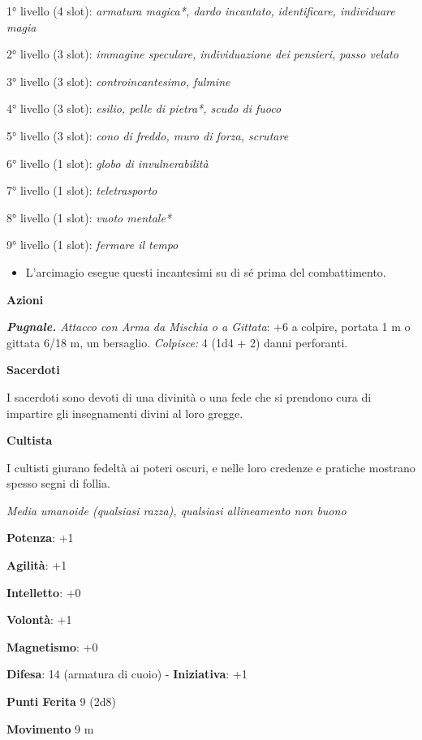 \begin{multicols}{2}
1° livello (4 slot): \emph{armatura magica*, dardo incantato,}
\emph{identificare, individuare magia}

2° livello (3 slot): \emph{immagine speculare, individuazione dei}
\emph{pensieri, passo velato}

3° livello (3 slot): \emph{controincantesimo, fulmine}

4° livello (3 slot): \emph{esilio, pelle di pietra*, scudo di fuoco}

5° livello (3 slot): \emph{cono di freddo, muro di forza, scrutare}

6° livello (1 slot): \emph{globo di invulnerabilità}

7° livello (1 slot): \emph{teletrasporto}

8° livello (1 slot): \emph{vuoto mentale*}

9° livello (1 slot): \emph{fermare il tempo}


\begin{itemize}
\item
  L'arcimagio esegue questi incantesimi su di sé prima del
  combattimento.
\end{itemize}


\smallskip\textbf{Azioni}

\emph{\textbf{Pugnale.} Attacco con Arma da Mischia o a Gittata}: +6 a
colpire, portata 1 m o gittata 6/18 m, un bersaglio. \emph{Colpisce:}
4 (1d4 + 2) danni perforanti.


\textbf{Sacerdoti}

I sacerdoti sono devoti di una divinità o una fede che si prendono cura
di impartire gli insegnamenti divini al loro gregge.

\textbf{Cultista}

I cultisti giurano fedeltà ai poteri oscuri, e nelle loro credenze e
pratiche mostrano spesso segni di follia.

\emph{Media umanoide (qualsiasi razza), qualsiasi allineamento non
buono}

\textbf{Potenza}: +1

\textbf{Agilità}: +1

\textbf{Intelletto}: +0

\textbf{Volontà}: +1

\textbf{Magnetismo}: +0

\textbf{Difesa}: 14 (armatura di cuoio) - \textbf{Iniziativa}: +1

\textbf{Punti Ferita} 9 (2d8)

\textbf{Movimento} 9 m


\end{multicols}
